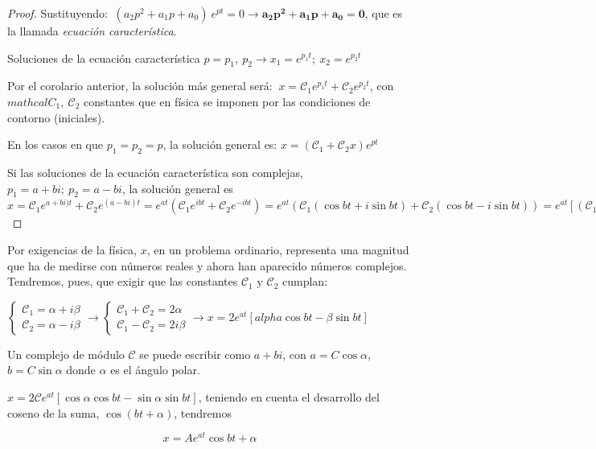 {\begin{proof}
 Sustituyendo: $\ (a_2 p^2+a_1p+a_0) \ e^{pt}= 0 \to \boldsymbol{a_2 p^2+a_1p+a_0=0}$, que es la llamada \emph{ecuación característica}.
 
 Soluciones de la ecuación característica $p=p_1,\ p_2 \to x_1=e^{p_1t}; \ x_2=e^{p_2t}$
 
 Por el corolario anterior, la solución más general será: $\ x=\mathcal C_1 e^{p_1t}+\mathcal C_2 e^{p_2t}$, con $mathcal C_1, \ \mathcal C_2$ constantes que en física se imponen por las condiciones de contorno (iniciales).
 
 En los casos en que $p_1=p_2=p$, la solución general es: $x=(\mathcal C_1+  \mathcal C_2 x) e^{pt}$
 
 Si las soluciones de la ecuación característica son complejas, $p_1=a+ b i; \ p_2=a-bi$, la solución general es $x=\mathcal C_1 e^{a+bi)t} + \mathcal C_2 e^{(a-bi)t}=e^{at} \left( \mathcal C_1 e^{ibt} + \mathcal C_2 e^{-ibt} \right) = e^{at} \left( \mathcal C_1 \left( \cos bt + i \sin bt \right) + \mathcal C_2 \left( \cos bt-i \sin bt \right) \right) = e^{at} \left[ \left( \mathcal C_1+\mathcal C_2 \right) \cos bt + i \left( \mathcal C_1-\mathcal C_2 \right) \sin bt \right]$
\end{proof}

Por exigencias de la física, $x$, en un problema ordinario, representa una magnitud que ha de medirse con números reales y ahora han aparecido números complejos. Tendremos, pues, que exigir que las constantes $\mathcal C_1 \text{ y } \mathcal C_2$ cumplan:

$\begin{cases}
 \mathcal C_1=\alpha + i \beta \\  \mathcal C_2	=\alpha - i \beta
\end{cases} \to
\begin{cases}
 \mathcal C_1 + \mathcal C_2 = 2\alpha \\ \mathcal C_1 - \mathcal C_2 =2i\beta
 \end{cases} \to x=2e^{at}\left[ alpha \cos bt - \beta \sin bt \right]$
 
 Un complejo de módulo $ \mathcal C $ se puede escribir como $a+bi$, con $a=C\cos \alpha$, $b=C \sin \alpha$ donde $\alpha$ es el ángulo polar. 
 
$x=2\mathcal C e^{at} \left[ \cos \alpha \cos bt - \sin \alpha \sin bt \right]$, teniendo en cuenta el desarrollo del coseno de la suma, $\cos(bt+\alpha)$, tendremos
 
$$x=A e^{at}\cos{bt+\alpha}$$

}
